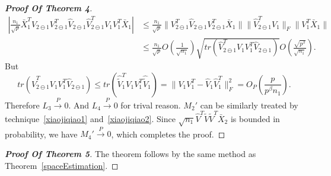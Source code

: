 \begin{proof}[\textbf{Proof Of Theorem 4}]
\begin{equation}
\begin{aligned}
|\frac{n_1}{\sqrt{p}}\bar{X}_1^T V_{2\ominus 1}V_{2\ominus 1}^T \hat{V}_{2\ominus 1}\hat{V}_{2\ominus 1}^T V_1 V_1^T \bar{X}_1|
&\leq \frac{n_1}{\sqrt{p}}\|V^T_{2\ominus 1}\hat{V}_{2\ominus 1}V_{2\ominus 1}^T\bar{X}_1\|\|\hat{V}_{2\ominus 1}^T V_1\|_F \|{V}_1^T\bar{X}_1\|\\
&\leq
\frac{n_1}{\sqrt{p}}O(\frac{1}{\sqrt{n_1}})\sqrt{tr(\hat{V}_{2\ominus 1}^T V_{1}V_{1}^T\hat{V}_{2\ominus 1})}O(\frac{\sqrt{p^{\beta}}}{\sqrt{n_1}}).
\end{aligned}
\end{equation}
But
\begin{equation*}
tr(\hat{V}_{2\ominus 1}^T V_{1}V_{1}^T\hat{V}_{2\ominus 1})\leq tr(\hat{\tilde{V}}_1^T {V}_1{V}_1^T\hat{\tilde{V}}_1)=\|V_1V_1^T- \hat{V}_1\hat{V}_1^T\|_F^2=O_P(\frac{p}{p^{\beta}n_1}).
\end{equation*}
Therefore $L_3\xrightarrow{P}0$. And $L_4\xrightarrow{P}0$ for trival reason.
 $M_2'$ can be similarly treated by technique~\eqref{xiaojiqiao1} and~\eqref{xiaojiqiao2}. Since $\sqrt{n_1}\hat{V}^T\tilde{V}\tilde{V}^T\bar{X}_2$ is bounded in probability, we have $M_4'\xrightarrow{P} 0$, which completes the proof.

    \end{proof}
\begin{proof}[\textbf{Proof Of Theorem 5}]
    The theorem follows by the same method as Theorem~\ref{spaceEstimation}.
\end{proof}
